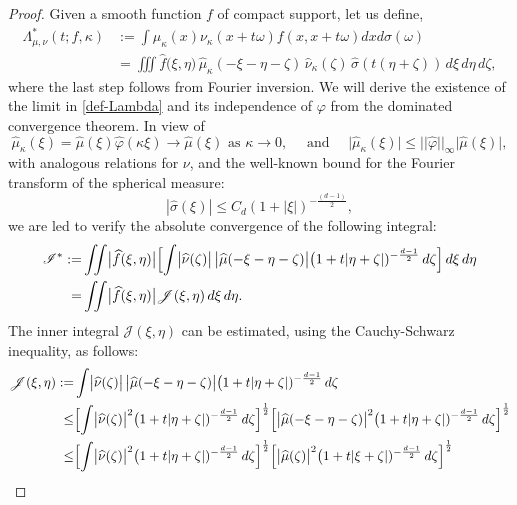 \documentclass[a4paper,11pt]{amsart}
\numberwithin{equation}{section}
\begin{document}
\begin{proof} 
Given a smooth function $f$ of compact support, let us define, 
\begin{align*} \Lambda_{\mu, \nu}^{\ast}(t; f, \kappa) &:= \int \mu_{\kappa}(x) \nu_{\kappa}(x + t \omega) f(x, x+ t\omega) dx d\sigma(\omega) \\ 
&=  \iiint \widehat{f}\bigl(\xi, \eta \bigr) \, \widehat{\mu}_{\kappa}(-\xi - \eta - \zeta) \, \widehat{\nu}_{\kappa}(\zeta) \, \widehat{\sigma}(t (\eta + \zeta)) \, d\xi \, d\eta \, d\zeta, 
\end{align*}
where the last step follows from Fourier inversion. We will derive the existence of the limit in \eqref{def-Lambda} and its independence of $\varphi$ from the dominated convergence theorem. In view of 
\[ \widehat{\mu}_{\kappa}(\xi) = \widehat{\mu}(\xi) \widehat{\varphi}(\kappa \xi) \longrightarrow \widehat{\mu}(\xi) \text{ as } \kappa \rightarrow 0, \quad \text{ and } \quad \bigl| \widehat{\mu}_{\kappa}(\xi) \bigr| \leq ||\widehat{\varphi}||_{\infty} \bigl|\widehat{\mu}(\xi) \bigr|, \] with analogous relations for $\nu$, and the well-known bound for the Fourier transform of the spherical measure: \[|\widehat{\sigma}(\xi)| \leq C_d (1 + |\xi|)^{-\frac{(d-1)}{2}},\]
we are led to verify the absolute convergence of the following integral: 
\begin{align} 
\mathscr{I}^{\ast} :=& \iint \bigl|\widehat{f}(\xi, \eta) \bigr| \Bigl[ \int  \bigl|\widehat{\nu}(\zeta) \bigr| \, \bigl| \widehat{\mu}(-\xi - \eta - \zeta) \bigr| \bigl(1 + t|\eta + \zeta|)^{-\frac{d-1}{2}} \, d\zeta \Bigr] \, d\xi \, d\eta \nonumber \\ 
  =&  \iint \bigl|\widehat{f}(\xi, \eta) \bigr| \mathscr{J}(\xi, \eta) \, d\xi \, d\eta. \label{Istar-final}
  \end{align}
  The inner integral $\mathscr{J}(\xi, \eta)$ can be estimated, using the Cauchy-Schwarz inequality, as follows:
  \begin{align} 
  \mathscr{J}(\xi, \eta) := &   \int  \bigl|\widehat{\nu}(\zeta) \bigr| \, \bigl| \widehat{\mu}(-\xi - \eta - \zeta) \bigr| \bigl(1 + t|\eta + \zeta|)^{-\frac{d-1}{2}} \, d\zeta \nonumber \\ 
  \leq & \Bigl[ \int \bigl|\widehat{\nu}(\zeta) \bigr|^2 \bigl(1 + t|\eta + \zeta|)^{-\frac{d-1}{2}} \, d\zeta  \Bigr]^{\frac{1}{2}} \Bigl[\bigl| \widehat{\mu}(-\xi - \eta - \zeta) \bigr|^2 \bigl(1 + t|\eta + \zeta|)^{-\frac{d-1}{2}} \, d\zeta \Bigr]^{\frac{1}{2}} \nonumber \\
  \leq & \Bigl[ \int \bigl|\widehat{\nu}(\zeta) \bigr|^2 \bigl(1 + t|\eta + \zeta|)^{-\frac{d-1}{2}} \, d\zeta  \Bigr]^{\frac{1}{2}} \Bigl[\bigl| \widehat{\mu}(\zeta) \bigr|^2 \bigl(1 + t|\xi + \zeta|)^{-\frac{d-1}{2}} \, d\zeta \Bigr]^{\frac{1}{2}} \nonumber \\

\end{align}
\end{proof}
\end{document}
